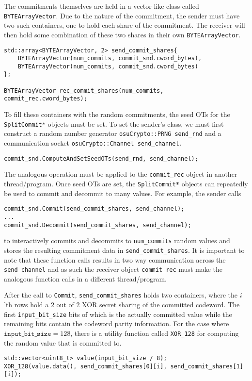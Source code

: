 The commitments themselves are held in a vector like class called \texttt{BYTEArrayVector}. Due to the nature of the commitment, the sender must have two such containers, one to hold each share of the commitment. The receiver will then hold some combination of these two shares in their own \texttt{BYTEArrayVector}.
\begin{lstlisting}
std::array<BYTEArrayVector, 2> send_commit_shares{
	BYTEArrayVector(num_commits, commit_snd.cword_bytes),
	BYTEArrayVector(num_commits, commit_snd.cword_bytes)
};

BYTEArrayVector rec_commit_shares(num_commits, commit_rec.cword_bytes);
\end{lstlisting}
To fill these containers with the random commitments, the seed OTs for the \texttt{SplitCommit*} objects must be set. To set the sender's class, we must first construct a random number generator \texttt{osuCrypto::PRNG send\_rnd} and a communication socket \texttt{osuCrypto::Channel send\_channel.} 
\begin{lstlisting}
commit_snd.ComputeAndSetSeedOTs(send_rnd, send_channel);
\end{lstlisting}
The analogous operation must be applied to the \texttt{commit\_rec} object in another thread/program. Once seed OTs are set, the \texttt{SplitCommit*} objects can repeatedly be used to commit and decommit to many values. For example, the sender calls
\begin{lstlisting}     
commit_snd.Commit(send_commit_shares, send_channel);
...
commit_snd.Decommit(send_commit_shares, send_channel);
\end{lstlisting}
to interactively commits and decommits to \texttt{num\_commits} random values and stores the resulting commitment data in \texttt{send\_commi\allowbreak t\_shares}. It is important to note that these function calls results in two way communication across the  \texttt{send\_channel} and as such the receiver object \texttt{commit\_rec} must make the analogous function calls in a different thread/program. 

After the call to \texttt{Commit}, \texttt{send\_commit\_shares} holds two containers, where the $i$'th rows hold a 2 out of 2 XOR secret sharing of the committed codeword. The first \texttt{input\_bit\_size} bits of which is the actually committed value while the remaining bits contain the codeword parity information. For the case where $\texttt{input\_bit\_size} =128$, there is a utility function called \texttt{XOR\_128} for computing the random value that is committed to.
\begin{lstlisting}     
std::vector<uint8_t> value(input_bit_size / 8);
XOR_128(value.data(), send_commit_shares[0][i], send_commit_shares[1][i]);
\end{lstlisting}

